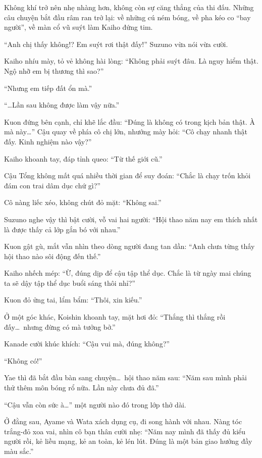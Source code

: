 \documentclass[../main.tex]{subfiles}
\begin{document}
Không khí trở nên nhẹ nhàng hơn, không còn sự căng thẳng của thi đấu. Những câu chuyện bắt đầu râm ran trở lại: về những cú ném bóng, về pha kéo co ``bay người'', về màn cổ vũ suýt làm Kaiho đứng tim.

``Anh chị thấy không!? Em suýt rơi thật đấy!'' Suzuno vừa nói vừa cười.

Kaiho nhíu mày, tỏ vẻ không hài lòng: ``Không phải suýt đâu. Là nguy hiểm thật. Ngộ nhỡ em bị thương thì sao?''

``Nhưng em tiếp đất ổn mà.''

``\dots Lần sau không được làm vậy nữa.''

Kuon đứng bên cạnh, chỉ khẽ lắc đầu: ``Đúng là không có trong kịch bản thật. À mà này\dots'' Cậu quay về phía cô chị lớn, nhướng mày hỏi: ``Cô chạy nhanh thật đấy. Kinh nghiệm nào vậy?''

Kaiho khoanh tay, đáp tỉnh queo: ``Từ thế giới cũ.''

Cậu Tổng không mất quá nhiều thời gian để suy đoán: ``Chắc là chạy trốn khỏi đám con trai dâm dục chứ gì?''

Cô nàng liếc xéo, không chút đỏ mặt: ``Không sai.''

Suzuno nghe vậy thì bật cười, vỗ vai hai người: ``Hội thao năm nay em thích nhất là được thấy cả lớp gắn bó với nhau.''

Kuon gật gù, mắt vẫn nhìn theo dòng người đang tan dần: ``Anh chưa từng thấy hội thao nào sôi động đến thế.''

Kaiho nhếch mép: ``Ừ, đúng dịp để cậu tập thể dục. Chắc là từ ngày mai chúng ta sẽ dậy tập thể dục buổi sáng thôi nhỉ?''

Kuon đỏ ửng tai, lẩm bẩm: ``Thôi, xin kiếu.''

Ở một góc khác, Koishin khoanh tay, mặt hơi đỏ: ``Thắng thì thắng rồi đấy\dots\ nhưng đừng có mà tưởng bở.''

Kanade cười khúc khích: ``Cậu vui mà, đúng không?''

``Không có!''

Yae thì đã bắt đầu bàn sang chuyện\dots\ hội thao năm sau: ``Năm sau mình phải thử thêm môn bóng rổ nữa. Lần này chưa đủ đã.''

``Cậu vẫn còn sức à\dots'' một người nào đó trong lớp thở dài.

Ở đằng sau, Ayame và Wata xách dụng cụ, đi song hành với nhau. Nàng tóc trắng-đỏ xoa vai, nhìn cô bạn thân cười nhẹ: ``Năm nay mình đã thấy đủ kiểu người rồi, kẻ liều mạng, kẻ an toàn, kẻ lén lút. Đúng là một bản giao hưởng đầy màu sắc.''
\end{document}
